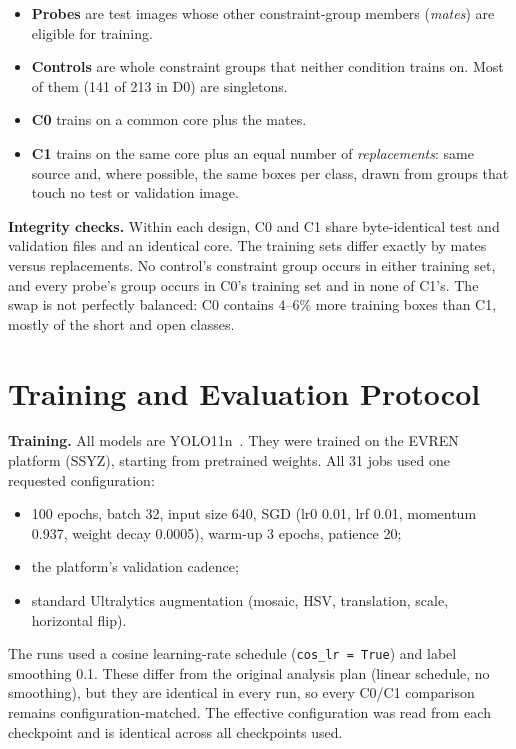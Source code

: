 \documentclass[11pt]{article}
\begin{document}
\begin{itemize}
\item \textbf{Probes} are test images whose other constraint-group members (\emph{mates}) are eligible for training.
\item \textbf{Controls} are whole constraint groups that neither condition trains on. Most of them (141 of 213 in D0) are singletons.
\item \textbf{C0} trains on a common core plus the mates.
\item \textbf{C1} trains on the same core plus an equal number of \emph{replacements}: same source and, where possible, the same boxes per class, drawn from groups that touch no test or validation image.
\end{itemize}
\textbf{Integrity checks.} Within each design, C0 and C1 share byte-identical test and validation files and an identical core. The training sets differ exactly by mates versus replacements. No control's constraint group occurs in either training set, and every probe's group occurs in C0's training set and in none of C1's. The swap is not perfectly balanced: C0 contains 4--6\% more training boxes than C1, mostly of the short and open classes.

\section{Training and Evaluation Protocol}
\textbf{Training.} All models are YOLO11n~\cite{jocher2024yolo11}. They were trained on the EVREN platform (SSYZ), starting from pretrained weights. All 31 jobs used one requested configuration:

\begin{itemize}
\item 100 epochs, batch 32, input size 640, SGD (lr0 0.01, lrf 0.01, momentum 0.937, weight decay 0.0005), warm-up 3 epochs, patience 20;
\item the platform's validation cadence;
\item standard Ultralytics augmentation (mosaic, HSV, translation, scale, horizontal flip).
\end{itemize}
The runs used a cosine learning-rate schedule (\texttt{cos\_lr = True}) and label smoothing 0.1. These differ from the original analysis plan (linear schedule, no smoothing), but they are identical in every run, so every C0/C1 comparison remains configuration-matched. The effective configuration was read from each checkpoint and is identical across all checkpoints used.
\end{document}
